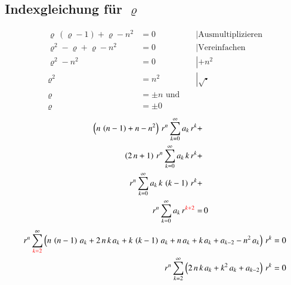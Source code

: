 \begin{refsection}
\subsection*{Indexgleichung f\"ur $\varrho$}
\begin{align*}
	\varrho \, \left( \varrho -1 \right) + \varrho - n^2 &= 0 && \left| \text{Ausmultiplizieren} \right. \\
	\varrho ^2 - \varrho + \varrho -n^2 &= 0 && \left| \text{Vereinfachen} \right.\\
	\varrho ^2 - n^2 &= 0 && \left| +n^2 \right.\\
	\varrho ^2 &= n^2 && \left| \sqrt{\centerdot} \right. \\
	\varrho &= \pm n \text{ und } \\
	\varrho &= \pm 0 %
\end{align*}
\begin{align*}
	\left(
	n \, \left( n - 1 \right)
	+
	n
	-
	n^2
	\right)
	\, r^{n}
	\sum_{k=0}^{\infty} a_k \, r^k
	+ \\
	\left(	
	2 \, n
	+
	1
	\right)
	\, r^{n}
	\sum_{k=0}^{\infty} a_k \, k \, r^k
	+ \\
	r^{n}
	\sum_{k=0}^{\infty} a_k \, k \, \left( k - 1 \right) \, r^k
	+ \\
	r^{n}
	\sum_{k=0}^{\infty} a_k \, r^{\textcolor{red}{k + 2}}
	= & \, 0
\end{align*}
\begin{align*}
	r^n
	\sum_{\textcolor{red}{k=2}}^{\infty}
	\left( n \, \left( n - 1 \right) \, a_k
	+
	2 \, n \, k \, a_k
	+
	k \, \left( k - 1 \right) \, a_k
	+
	n \, a_k
	+
	k \, a_k
	+
	a_{k-2}
	-
	n^2 \, a_k
	\right)
	\, r^k
	= 0 \\
	r^n
	\sum_{k=2}^{\infty}
	\left(
	2 \, n \, k \, a_k
	+
	k^2 \, a_k
	+
	a_{k - 2}
	\right)
	\, r^k
	= 0
\end{align*}

\end{refsection}
